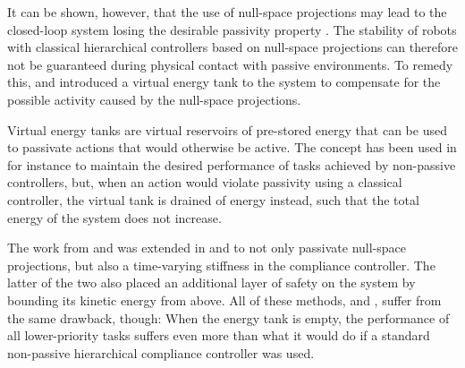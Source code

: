 \documentclass[../main.tex]{subfiles}
\begin{document}
It can be shown, however, that the use of null-space projections may lead to the closed-loop system losing the desirable passivity property \cite{dietrichPassivationProjectionBasedNull2016}. The stability of robots with classical hierarchical controllers based on null-space projections can therefore not be guaranteed during physical contact with passive environments. To remedy this, \cite{dietrichPassivationProjectionBasedNull2016} and \cite{dietrichPassiveHierarchicalImpedance2017} introduced a virtual energy tank to the system to compensate for the possible activity caused by the null-space projections.


Virtual energy tanks are virtual reservoirs of pre-stored energy that can be used to passivate actions that would otherwise be active. The concept has been used in for instance \cite{schindlbeckUnifiedPassivitybasedCartesian2015,shahriariValvebasedVirtualEnergy2018,benziAdaptiveTankbasedControl2022} to maintain the desired performance of tasks achieved by non-passive controllers, but, when an action would violate passivity using a classical controller, the virtual tank is drained of energy instead, such that the total energy of the system does not increase. 

The work from \cite{dietrichPassivationProjectionBasedNull2016} and \cite{dietrichPassiveHierarchicalImpedance2017} was extended in \cite{michelPassivitybasedVariableImpedance2020} and \cite{michelSafetyAwareHierarchicalPassivityBased2022} to not only passivate null-space projections, but also a time-varying stiffness in the compliance controller. The latter of the two also placed an additional layer of safety on the system by bounding its kinetic energy from above. All of these methods, \cite{dietrichPassivationProjectionBasedNull2016,dietrichPassiveHierarchicalImpedance2017,michelPassivitybasedVariableImpedance2020} and \cite{michelSafetyAwareHierarchicalPassivityBased2022}, suffer from the same drawback, though: When the energy tank is empty, the performance of all lower-priority tasks suffers even more than what it would do if a standard non-passive hierarchical compliance controller was used. 
\end{document}
